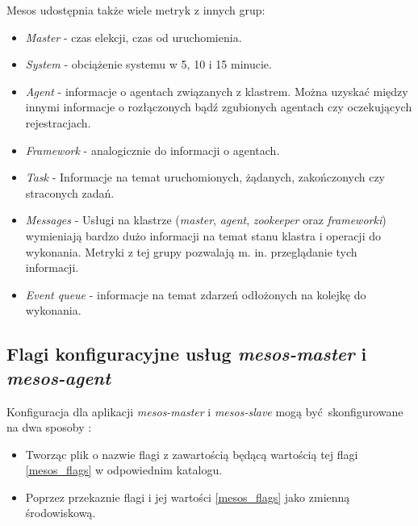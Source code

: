 \documentclass[10pt,a4paper,titlepage,twoside]{report}
\begin{document}
Mesos udostępnia także wiele metryk z innych grup:
\begin{itemize}
\item \textit{Master} - czas elekcji, czas od uruchomienia.
\item \textit{System} - obciążenie systemu w 5, 10 i 15 minucie.
\item \textit{Agent} - informacje o agentach związanych z klastrem. Można uzyskać między innymi informacje o rozłączonych bądź zgubionych agentach czy oczekujących rejestracjach.
\item \textit{Framework} - analogicznie do informacji o agentach.
\item \textit{Task} - Informacje na temat uruchomionych, żądanych, zakończonych czy straconych zadań.
\item \textit{Messages} - Usługi na klastrze (\textit{master}, \textit{agent}, \textit{zookeeper} oraz \textit{frameworki}) wymieniają bardzo dużo informacji na temat stanu klastra i operacji do wykonania. Metryki z tej grupy pozwalają m. in. przeglądanie tych informacji.
\item \textit{Event queue} - informacje na temat zdarzeń odłożonych na kolejkę do wykonania.
\end{itemize}

\subsection{Flagi konfiguracyjne usług \textit{mesos-master} i \textit{mesos-agent}}
Konfiguracja dla aplikacji \textit{mesos-master} i \textit{mesos-slave} mogą być skonfigurowane na dwa sposoby \cite{ad34}:
\begin{itemize}
\item Tworząc plik o nazwie flagi z zawartością będącą wartością tej flagi \ref{mesos_flags} w odpowiednim katalogu.
\item Poprzez przekaznie flagi i jej wartości \ref{mesos_flags} jako zmienną środowiskową.
\end{itemize}
\end{document}
